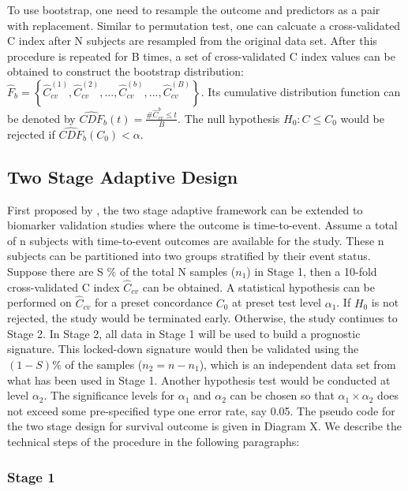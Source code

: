 \documentclass[11pt]{article}
\begin{document}
	\par To use bootstrap, one need to resample the outcome and predictors as a pair with replacement. Similar to permutation test, one can calcuate a cross-validated C index after N subjects are resampled from the original data set. After this procedure is repeated for B times, a set of cross-validated C index values can be obtained to construct the bootstrap distribution: $\hat{F}_b =\left\{\hat{C}_{cv}^{(1)}, \hat{C}_{cv}^{(2)}, ... ,\hat{C}_{cv}^{(b)}, ... , \hat{C}_{cv}^{(B)} \right\}$. Its cumulative distribution function can be denoted by $\widehat{CDF}_{b}(t) = \frac{\# \hat{C}_{cv}^{b} \leq t}{B}$. The null hypothesis $H_0: C \leq C_{0}$ would be rejected if $\widehat{CDF}_{b}(C_{0}) < \alpha$.
 

	\subsection{Two Stage Adaptive Design}

	First proposed by \cite{Polley2014}, the two stage adaptive framework can be extended to biomarker validation studies where the outcome is time-to-event. Assume a total of n subjects with time-to-event outcomes are available for the study. These n subjects can be partitioned into two groups stratified by their event status. Suppose there are S $\%$ of the total N samples ($n_1$) in Stage 1, then a 10-fold cross-validated C index $\hat{C}_{cv}$ can be obtained. A statistical hypothesis can be performed on $\hat{C}_{cv}$ for a preset concordance $C_0$ at preset test level $\alpha_1$. If $H_{0}$ is not rejected, the study would be terminated early. Otherwise, the study continues to Stage 2. In Stage 2, all data in Stage 1 will be used to build a prognostic signature. This locked-down signature would then be validated using the $(1-S)\%$ of the samples ($n_2 = n - n_1$), which is an independent data set from what has been used in Stage 1. Another hypothesis test would be conducted at level $\alpha_2$. The significance levels for $\alpha_1$ and $\alpha_2$ can be chosen so that $\alpha_1 \times \alpha_2$ does not exceed some pre-specified type one error rate, say 0.05. The pseudo code for the two stage design for survival outcome is given in Diagram X. We describe the technical steps of the procedure in the following paragraphs:

	\subsubsection*{Stage 1}
		
\end{document}
